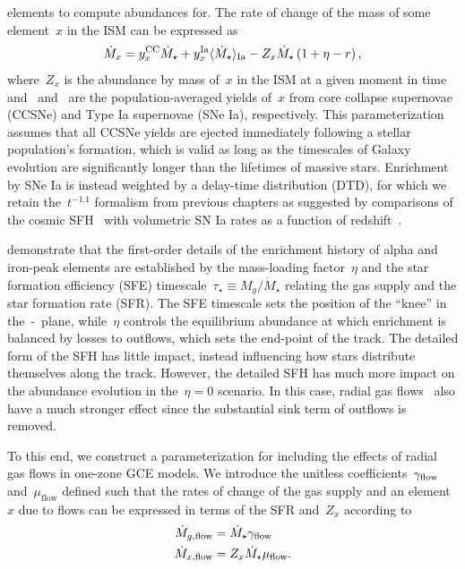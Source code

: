 elements to compute abundances for.
The rate of change of the mass of some element~$x$ in the ISM can be
expressed as
\begin{equation}
\dot{M}_x = y_\text{$x$}^\text{CC} \dot{M}_\star +
y_\text{$x$}^\text{Ia} \langle \dot{M}_\star \rangle_\text{Ia} -
Z_x \dot{M}_\star \left(1 + \eta - r\right),
\label{outflows:eq:mdot-element-noflow}
\end{equation}
where~$Z_x$ is the abundance by mass of~$x$ in the ISM at a given moment in
time and~ and~ are the population-averaged yields of~$x$
from core collapse supernovae (CCSNe) and Type Ia supernovae (SNe Ia),
respectively.
This parameterization assumes that all CCSNe yields are ejected immediately
following a stellar population's formation, which is valid as long as the
timescales of Galaxy evolution are significantly longer than the lifetimes
of massive stars.
Enrichment by SNe Ia is instead weighted by a delay-time distribution (DTD),
for which we retain the~$t^{-1.1}$ formalism from previous chapters as
suggested by comparisons of the cosmic SFH~\citep[e.g.,][]{Madau2017,
Driver2018} with volumetric SN Ia rates as a function of
redshift~\citep{Maoz2012a, Maoz2012b, Graur2013, Graur2014}.
\par
\citet{Weinberg2017b} demonstrate that the first-order details of the
enrichment history of alpha and iron-peak elements are established by
the mass-loading factor~$\eta$ and the star formation efficiency (SFE)
timescale~$\tau_\star \equiv M_g / \dot{M}_\star$ relating the
gas supply and the star formation rate (SFR).
The SFE timescale sets the position of the ``knee'' in the~\afe-\feh~plane,
while~$\eta$ controls the equilibrium abundance at which enrichment is
balanced by losses to outflows, which sets the end-point of the track.
The detailed form of the SFH has little impact, instead influencing how
stars distribute themselves along the track.
However, the detailed SFH has much more impact on the abundance evolution
in the~$\eta = 0$ scenario.
In this case, radial gas flows~\citep[e.g.,][]{Lacey1985}
also have a much stronger effect since the substantial sink term of
outflows is removed.
\par
To this end, we construct a parameterization for including the effects of
radial gas flows in one-zone GCE models.
We introduce the unitless coefficients~$\gamma_{\text{flow}}$ and~$\mu_\text{flow}$
defined such that the rates of change of the gas supply and an element~$x$ due
to flows can be expressed in terms of the SFR and~$Z_x$ according to
\begin{subequations}\begin{align}
\dot{M}_{g,\text{flow}} &= \dot{M}_\star \gamma_{\text{flow}}
\label{outflows:eq:mdot-gas-flow}
\\
\dot{M}_{x,\text{flow}} &= Z_x \dot{M}_\star \mu_{\text{flow}}.
\label{outflows:eq:mdot-element-flow}
\end{align}\end{subequations}
